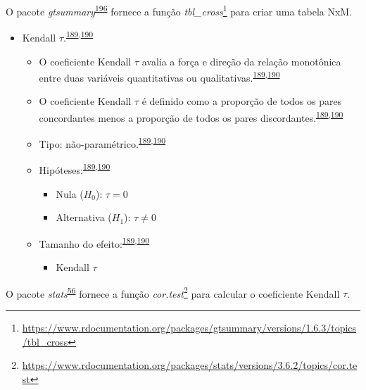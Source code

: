 \documentclass[
  a4paper,
]{book}
\providecommand{\tightlist}{%
  \setlength{\itemsep}{0pt}\setlength{\parskip}{0pt}}
\renewcommand{\href}[2]{#2\footnote{\url{#1}}}
\newenvironment{infobox}[1]
  {
  \begin{itemize}
  \renewcommand{\labelitemi}{
    \raisebox{-.7\height}[0pt][0pt]{
      {\setkeys{Gin}{width=3em,keepaspectratio}
        \texttt{[image: \#1]}}
    }
  }
  \setlength{\fboxsep}{1em}
  \begin{blackbox}
  \item
  }
  {
  \end{blackbox}
  \end{itemize}
  }
\begin{document}
\begin{infobox}{images/Rlogo}
O pacote \emph{gtsummary}\textsuperscript{\protect\hyperlink{ref-gtsummary}{196}} fornece a função \href{https://www.rdocumentation.org/packages/gtsummary/versions/1.6.3/topics/tbl_cross}{\emph{tbl\_cross}} para criar uma tabela NxM.

\end{infobox}

\begin{itemize}
\item
  Kendall \(\tau\).\textsuperscript{\protect\hyperlink{ref-khamis2008}{189},\protect\hyperlink{ref-allison2022}{190}}

  \begin{itemize}
  \item
    O coeficiente Kendall \(\tau\) avalia a força e direção da relação monotônica entre duas variáveis quantitativas ou qualitativas.\textsuperscript{\protect\hyperlink{ref-khamis2008}{189},\protect\hyperlink{ref-allison2022}{190}}
  \item
    O coeficiente Kendall \(\tau\) é definido como a proporção de todos os pares concordantes menos a proporção de todos os pares discordantes.\textsuperscript{\protect\hyperlink{ref-khamis2008}{189},\protect\hyperlink{ref-allison2022}{190}}
  \item
    Tipo: não-paramétrico.\textsuperscript{\protect\hyperlink{ref-khamis2008}{189},\protect\hyperlink{ref-allison2022}{190}}
  \item
    Hipóteses:\textsuperscript{\protect\hyperlink{ref-khamis2008}{189},\protect\hyperlink{ref-allison2022}{190}}

    \begin{itemize}
    \item
      Nula (\(H_{0}\)): \(\tau=0\)
    \item
      Alternativa (\(H_{1}\)): \(\tau≠0\)
    \end{itemize}
  \item
    Tamanho do efeito:\textsuperscript{\protect\hyperlink{ref-khamis2008}{189},\protect\hyperlink{ref-allison2022}{190}}

    \begin{itemize}
    \tightlist
    \item
      Kendall \(\tau\)
    \end{itemize}
  \end{itemize}
\end{itemize}

\begin{infobox}{images/Rlogo}
O pacote \emph{stats}\textsuperscript{\protect\hyperlink{ref-stats-2}{56}} fornece a função \href{https://www.rdocumentation.org/packages/stats/versions/3.6.2/topics/cor.test}{\emph{cor.test}} para calcular o coeficiente Kendall \(\tau\).

\end{infobox}
\end{document}
